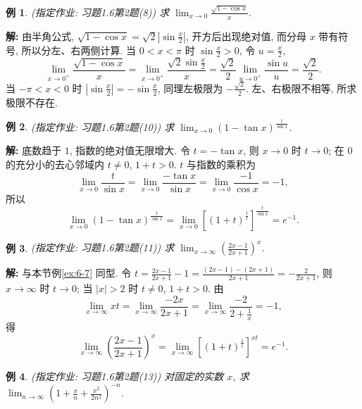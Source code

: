 \documentclass[UTF8,openany]{ctexbook}
\theoremstyle{chinesetextbook}
\newtheorem{example}{例}[section]
\newenvironment{cnsolution}{\par\indent\textbf{解:} \ignorespaces}{\par}
\begin{document}
\begin{example}
\textnormal{(指定作业: 习题1.6第2题(8))} 求 $\displaystyle\lim_{x\to0}\frac{\sqrt{1-\cos x}}x$.
\end{example}
\begin{cnsolution}
由半角公式, $\displaystyle\sqrt{1-\cos x}=\sqrt2\left|\sin\frac x2\right|$, 开方后出现绝对值, 而分母 $x$ 带有符号, 所以分左、右两侧计算. 当 $0<x<\pi$ 时 $\displaystyle\sin\frac x2>0$, 令 $\displaystyle u=\frac x2$,
\[
\lim_{x\to0^+}\frac{\sqrt{1-\cos x}}x=\lim_{x\to0^+}\frac{\sqrt2\sin\frac x2}x=\frac{\sqrt2}2\lim_{u\to0^+}\frac{\sin u}u=\frac{\sqrt2}2.
\]
当 $-\pi<x<0$ 时 $\displaystyle\left|\sin\frac x2\right|=-\sin\frac x2$, 同理左极限为 $\displaystyle-\frac{\sqrt2}2$. 左、右极限不相等, 所求极限不存在.
\end{cnsolution}
\begin{example}
\textnormal{(指定作业: 习题1.6第2题(10))} 求 $\displaystyle\lim_{x\to0}(1-\tan x)^{\frac1{\sin x}}$.
\end{example}
\begin{cnsolution}
底数趋于 $1$, 指数的绝对值无限增大. 令 $t=-\tan x$, 则 $x\to0$ 时 $t\to0$; 在 $0$ 的充分小的去心邻域内 $t\ne0$, $1+t>0$. $t$ 与指数的乘积为
\[
\lim_{x\to0}\frac t{\sin x}=\lim_{x\to0}\frac{-\tan x}{\sin x}=\lim_{x\to0}\frac{-1}{\cos x}=-1,
\]
所以
\[
\lim_{x\to0}(1-\tan x)^{\frac1{\sin x}}=\lim_{x\to0}\left[(1+t)^{\frac1t}\right]^{\frac t{\sin x}}=e^{-1}.
\]
\end{cnsolution}
\begin{example}
\textnormal{(指定作业: 习题1.6第2题(11))} 求 $\displaystyle\lim_{x\to\infty}\left(\frac{2x-1}{2x+1}\right)^x$.
\end{example}
\begin{cnsolution}
与本节例\ref{ex:6-7} 同型. 令 $\displaystyle t=\frac{2x-1}{2x+1}-1=\frac{(2x-1)-(2x+1)}{2x+1}=-\frac2{2x+1}$, 则 $x\to\infty$ 时 $t\to0$; 当 $|x|>2$ 时 $t\ne0$, $1+t>0$. 由
\[
\lim_{x\to\infty}xt=\lim_{x\to\infty}\frac{-2x}{2x+1}=\lim_{x\to\infty}\frac{-2}{2+\frac1x}=-1,
\]
得
\[
\lim_{x\to\infty}\left(\frac{2x-1}{2x+1}\right)^x=\lim_{x\to\infty}\left[(1+t)^{\frac1t}\right]^{xt}=e^{-1}.
\]
\end{cnsolution}
\begin{example}
\textnormal{(指定作业: 习题1.6第2题(13))} 对固定的实数 $x$, 求 $\displaystyle\lim_{n\to\infty}\left(1+\frac xn+\frac{x^2}{2n^2}\right)^{-n}$.
\end{example}
\end{document}
